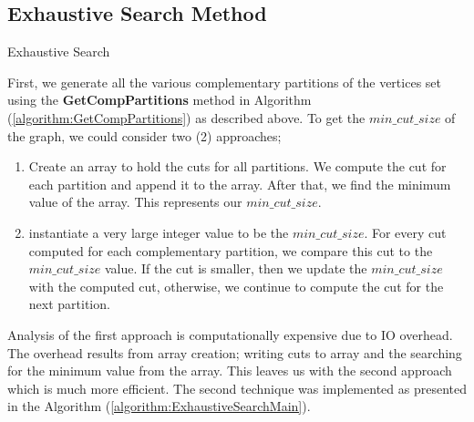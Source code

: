 \documentclass[longpaper, english, final, times]{revdetua}
\begin{document}
		\subsection{Exhaustive Search Method}
			\begin{algorithm}
				\caption{Exhaustive Search}
				\label{algorithm:ExhaustiveSearchMain}
				\DontPrintSemicolon
				
				
			\end{algorithm}
		
		
			First, we generate all the various complementary partitions of the vertices set using the \textbf{GetCompPartitions} method in Algorithm (\ref{algorithm:GetCompPartitions}) as described above. To get the $min\_cut\_size$ of the graph, we could consider two (2) approaches;
			\begin{enumerate}[label=(\arabic*)]
				\item Create an array to hold the cuts for all partitions. We compute the cut for each partition and append it to the array. After that, we find the minimum value of the array. This represents our $min\_cut\_size$.
				\item instantiate a very large integer value to be the $min\_cut\_size$. For every cut computed for each complementary partition, we compare this cut to the $min\_cut\_size$ value. If the cut is smaller, then we update the $min\_cut\_size$ with the computed cut, otherwise, we continue to compute the cut for the next partition.
			\end{enumerate}
			Analysis of the first approach is computationally expensive due to IO overhead. The overhead results from array creation; writing cuts to array and the searching for the minimum value from the array. This leaves us with the second approach which is much more efficient. The second technique was implemented as presented in the Algorithm (\ref{algorithm:ExhaustiveSearchMain}).\\
			
\end{document}
